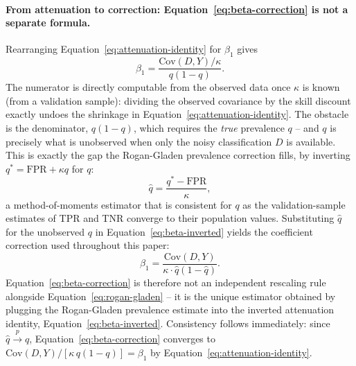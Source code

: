 \documentclass[12pt]{article}
\begin{document}
\paragraph{From attenuation to correction: Equation~\ref{eq:beta-correction} is not a separate formula.} Rearranging Equation~\ref{eq:attenuation-identity} for $\beta_1$ gives
\begin{equation}
\beta_1 = \frac{\mathrm{Cov}(D,Y)/\kappa}{q(1-q)}.
\label{eq:beta-inverted}
\end{equation}
The numerator is directly computable from the observed data once $\kappa$ is known (from a validation sample): dividing the observed covariance by the skill discount exactly undoes the shrinkage in Equation~\ref{eq:attenuation-identity}. The obstacle is the denominator, $q(1-q)$, which requires the \emph{true} prevalence $q$ -- and $q$ is precisely what is unobserved when only the noisy classification $D$ is available. This is exactly the gap the Rogan-Gladen prevalence correction \citep{rogan1978estimating} fills, by inverting $q^{*} = \text{FPR} + \kappa q$ for $q$:
\begin{equation}
\hat{q} = \frac{q^{*} - \text{FPR}}{\kappa},
\label{eq:rogan-gladen}
\end{equation}
a method-of-moments estimator that is consistent for $q$ as the validation-sample estimates of TPR and TNR converge to their population values. Substituting $\hat q$ for the unobserved $q$ in Equation~\ref{eq:beta-inverted} yields the coefficient correction used throughout this paper:
\begin{equation}
\hat{\beta}_1 = \frac{\mathrm{Cov}(D, Y)}{\kappa \cdot \hat{q}(1-\hat{q})}.
\label{eq:beta-correction}
\end{equation}
Equation~\ref{eq:beta-correction} is therefore not an independent rescaling rule alongside Equation~\ref{eq:rogan-gladen} -- it is the unique estimator obtained by plugging the Rogan-Gladen prevalence estimate into the inverted attenuation identity, Equation~\ref{eq:beta-inverted}. Consistency follows immediately: since $\hat q \overset{p}{\to} q$, Equation~\ref{eq:beta-correction} converges to $\mathrm{Cov}(D,Y)/[\kappa\, q(1-q)] = \beta_1$ by Equation~\ref{eq:attenuation-identity}.
\end{document}
